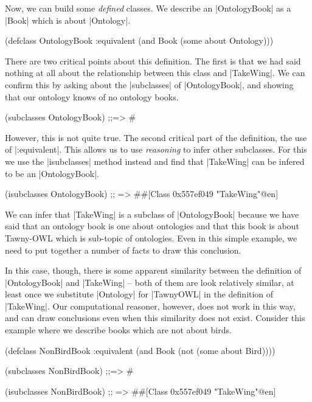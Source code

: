 Now, we can build some \emph{defined} classes. We describe an |OntologyBook|
as a |Book| which is about |Ontology|.

\begin{tawny}
(defclass
 OntologyBook
 :equivalent
 (and Book
      (some about Ontology)))
\end{tawny}

There are two critical points about this definition. The first is that we had
said nothing at all about the relationship between this class and |TakeWing|.
We can confirm this by asking about the |subclasses| of |OntologyBook|, and
showing that our ontology knows of no ontology books.

\begin{tawny}
(subclasses OntologyBook)
;;=> #{}
\end{tawny}

However, this is not quite true. The second critical part of the definition,
the use of |:equivalent|. This allows us to use \emph{reasoning} to infer
other subclasses. For this we use the |isubclasses| method instead and find
that |TakeWing| can be infered to be an |OntologyBook|.

\begin{tawny}
(isubclasses OntologyBook)
;; => #{#[Class 0x557ef049 "TakeWing"@en]}
\end{tawny}

We can infer that |TakeWing| is a subclass of |OntologyBook| because we have
said that an ontology book is one about ontologies and that this book is about
Tawny-OWL which is sub-topic of ontologies. Even in this simple example, we
need to put together a number of facts to draw this conclusion.

In this case, though, there is some apparent similarity between the definition
of |OntologyBook| and |TakeWing| -- both of them are look relatively similar,
at least once we substitute |Ontology| for |TawnyOWL| in the definition of
|TakeWing|. Our computational reasoner, however, does not work in this way,
and can draw conclusions even when this similarity does not exist. Consider
this example where we describe books which are not about birds.

\begin{tawny}
(defclass NonBirdBook
  :equivalent
  (and Book
       (not (some about Bird))))

(subclasses NonBirdBook)
;;=> #{}

(isubclasses NonBirdBook)
;; => #{#[Class 0x557ef049 "TakeWing"@en]}
\end{tawny}

